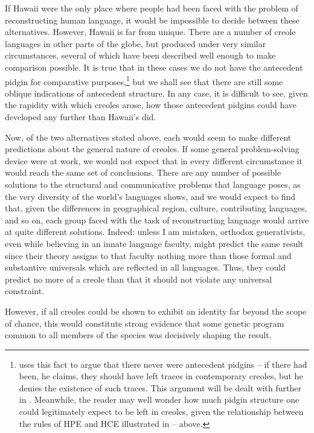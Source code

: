If Hawaii were the only place where people had been faced with the problem of reconstructing human language, it would be impossible to decide between these alternatives. However, Hawaii is far from unique. There are a number of creole languages in other parts of the globe, but produced under very similar circumstances, several of which have been described well enough to make comparison possible. It is true that in these cases we do not have the antecedent pidgin for comparative purposes,\footnote{\citet{Alleyne1979} uses this fact to argue that there never were antecedent pidgins -- if there had been, he claims, they should have left traces in contemporary creoles, but he denies the existence of such traces. This argument will be dealt with further in . Meanwhile, the reader may well wonder how much pidgin structure one could legitimately expect to be left in creoles, given the relation\-ship between the rules of HPE and HCE illustrated in -- above.} but we shall see that there are still some oblique indications of antecedent structure. In any case, it is difficult to see, given the rapidity with which creoles arose, how those antecedent pidgins could have developed any further than Hawaii's did.


Now, of the two alternatives stated above, each would seem to make different predictions about the general nature of creoles. If some general problem-solving device were at work, we would not expect that in every different circumstance it would reach the same set of conclusions. There are any number of possible solutions to the struc\-tural and communicative problems that language poses, as the very diversity of the world's languages shows, and we would expect to find that, given the differences in geographical region, culture, contributing languages, and so on, each group faced with the task of reconstructing language would arrive at quite different solutions. Indeed: unless I am mistaken, orthodox generativists, even while believing in an innate language faculty, might predict the same result since their theory assigns to that faculty nothing more than those formal and substantive universals which are reflected in all languages. Thus, they could pre\-dict no more of a creole than that it should not violate any universal constraint.

However, if all creoles could be shown to exhibit an identity far beyond the scope of chance, this would constitute strong evidence that some genetic program common to all members of the species was decisively shaping the result.

